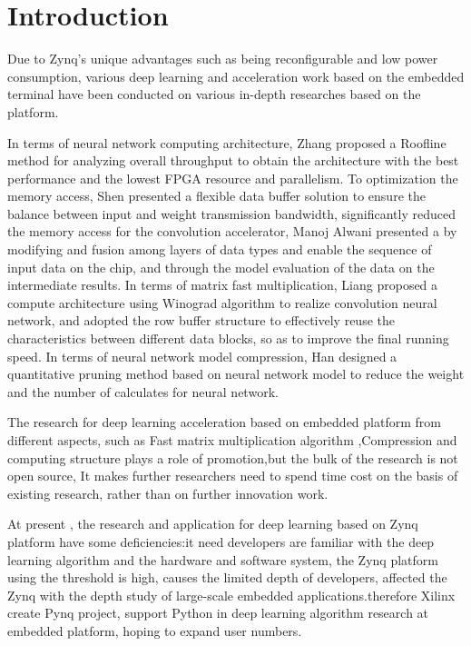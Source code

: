 \section{Introduction}
Due to Zynq's unique advantages such as being reconfigurable and low power consumption, various deep learning and acceleration work based on the embedded terminal have been conducted on various in-depth researches based on the platform.

In terms of neural network computing architecture, Zhang\cite{zhang2015optimizing} proposed a Roofline method for analyzing overall throughput to obtain the architecture with the best performance and the lowest FPGA resource and parallelism. To optimization the memory access, Shen\cite{ma2017hardware} presented a flexible data buffer solution to ensure the balance between input and weight transmission bandwidth, significantly reduced the memory access for the convolution accelerator, Manoj Alwani\cite{alwani2016fused} presented a by modifying and fusion among layers of data types and enable the sequence of input data on the chip, and through the model evaluation of the data on the intermediate results. In terms of matrix fast multiplication, Liang\cite{lu2017evaluating} proposed a compute architecture using Winograd algorithm to realize convolution neural network, and adopted the row buffer structure to effectively reuse the characteristics between different data blocks, so as to improve the final running speed. In terms of neural network model compression, Han\cite{han2015deep} designed a quantitative pruning method based on neural network model to reduce the weight and the number of calculates for neural network.

The research for deep learning acceleration based on embedded platform from different aspects, such as Fast matrix multiplication algorithm ,Compression and computing structure plays a role of promotion,but the bulk of the research is not open source,  It makes further researchers need to spend time cost on the basis of existing research, rather than on further innovation work.

At present , the research and application for deep learning based on Zynq platform have some deficiencies:it need developers are familiar with the deep learning algorithm and the hardware and software system, the Zynq platform using the threshold is high, causes the limited depth of developers, affected the Zynq with the depth study of large-scale embedded applications.therefore Xilinx create Pynq project, support Python in deep learning algorithm research at embedded platform, hoping to expand user numbers.

